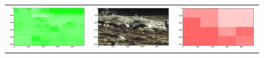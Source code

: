 \begin{figure}[h!tb]
\begin{minipage}{1.3\textwidth}
\begin{tabular}{ccc}
\includegraphics[keepaspectratio=true,width=\segwidth]{images/segment/31_11__animals__.png} &
\includegraphics[keepaspectratio=true,width=\segwidth]{images/segment/31_11__image__.png} &
\includegraphics[keepaspectratio=true,width=\segwidth]{images/segment/31_11__plastic__.png} \\


\end{tabular}
\end{minipage}
\end{figure}
